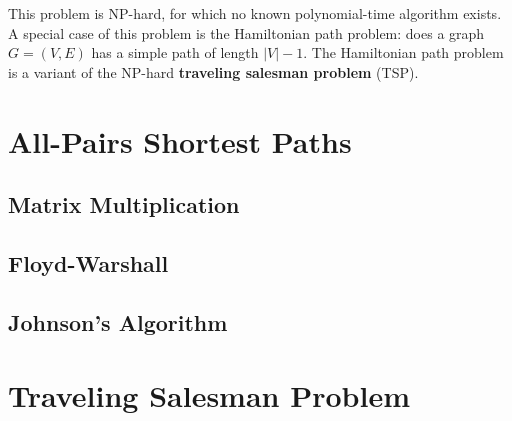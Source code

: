 This problem is NP-hard, for which no known polynomial-time algorithm exists. A special case of this problem is the Hamiltonian path problem: does a graph $G=(V,E)$ has a simple path of length $|V|-1$. The Hamiltonian path problem is a variant of the NP-hard \textbf{traveling salesman problem} (TSP).

\section{All-Pairs Shortest Paths}

\subsection{Matrix Multiplication}

\subsection{Floyd-Warshall}

\subsection{Johnson's Algorithm}

\section{Traveling Salesman Problem}